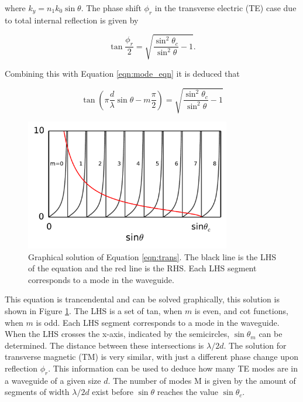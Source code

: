 where $k_y = n_1 k_0 \sin{\theta}$. The phase shift $\phi_r$ in the transverse
electric (TE) case due to total internal reflection is given by

\begin{equation} \tan{\frac{\phi_r}{2}} =
\sqrt{\frac{\sin^2\theta_c}{\sin^2\theta} - 1}. \end{equation}

Combining this with Equation \ref{eqn:mode_eqn} it is deduced that

\begin{equation}\label{eqn:trans} \tan \left( \pi \frac{d}{\lambda} \sin \theta -
m \frac{\pi}{2} \right) = \sqrt{\frac{\sin^2\theta_c}{\sin^2\theta} - 1}
\end{equation}

\begin{figure}[h!] \begin{center}
\includegraphics[width=0.8\textwidth]{images/mode.pdf} \end{center}
\caption{Graphical solution of Equation \ref{eqn:trans}. The black line is the
LHS of the equation and the red line is the RHS. Each LHS segment corresponds to
a mode in the waveguide.} \label{fig:mode} \end{figure}

This equation is trancendental and can be solved graphically, this solution is
shown in Figure \ref{fig:mode}. The LHS is a set of tan, when $m$ is even, and
cot functions, when $m$ is odd. Each LHS segment corresponds to a mode in the
waveguide. When the LHS crosses the x-axis, indicated by the semicircles, $\sin
\theta_m$ can be determined. The distance between these intersections is
$\lambda/2d$. The solution for transverse magnetic (TM) is very similar, with
just a different phase change upon reflection $\phi_r$. This information can be
used to deduce how many TE modes are in a waveguide of a given size $d$. The
number of modes M is given by the amount of segments of width $\lambda/2d$ exist
before $\sin \theta$ reaches the value $\sin \theta_c$.

